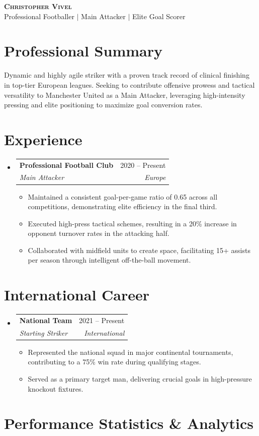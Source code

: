 \documentclass[letterpaper,11pt]{article}
\makeatletter
\newcommand{\resumeItem}[1]{
\item\small{
{#1 \vspace{-2pt}}
}
}
\newcommand{\resumeSubheading}[4]{
\vspace{-2pt}\item
\begin{tabular*}{0.97\textwidth}[t]{l@{\extracolsep{\fill}}r}
\textbf{#1} & #2 \\
\textit{\small#3} & \textit{\small #4} \\
\end{tabular*}\vspace{-7pt}
}
\newcommand{\resumeSubHeadingListStart}{\begin{itemize}[leftmargin=0.15in, label={}]}
\newcommand{\resumeSubHeadingListEnd}{\end{itemize}}
\newcommand{\resumeItemListStart}{\begin{itemize}}
\newcommand{\resumeItemListEnd}{\end{itemize}\vspace{-5pt}}
\makeatother
\begin{document}
\begin{center}
\textbf{\Huge \scshape Christopher Vivel} \\ \vspace{5pt}
\small Professional Footballer $|$ Main Attacker $|$ Elite Goal Scorer
\end{center}

\section{Professional Summary}
Dynamic and highly agile striker with a proven track record of clinical finishing in top-tier European leagues. Seeking to contribute offensive prowess and tactical versatility to Manchester United as a Main Attacker, leveraging high-intensity pressing and elite positioning to maximize goal conversion rates.

\section{Experience}
\resumeSubHeadingListStart
\resumeSubheading{Professional Football Club}{2020 -- Present}{Main Attacker}{Europe}
\resumeItemListStart
\resumeItem{Maintained a consistent goal-per-game ratio of 0.65 across all competitions, demonstrating elite efficiency in the final third.}
\resumeItem{Executed high-press tactical schemes, resulting in a 20\% increase in opponent turnover rates in the attacking half.}
\resumeItem{Collaborated with midfield units to create space, facilitating 15+ assists per season through intelligent off-the-ball movement.}
\resumeItemListEnd
\resumeSubHeadingListEnd

\section{International Career}
\resumeSubHeadingListStart
\resumeSubheading{National Team}{2021 -- Present}{Starting Striker}{International}
\resumeItemListStart
\resumeItem{Represented the national squad in major continental tournaments, contributing to a 75\% win rate during qualifying stages.}
\resumeItem{Served as a primary target man, delivering crucial goals in high-pressure knockout fixtures.}
\resumeItemListEnd
\resumeSubHeadingListEnd

\section{Performance Statistics \& Analytics}
\begin{center}
\end{center}
\end{document}
